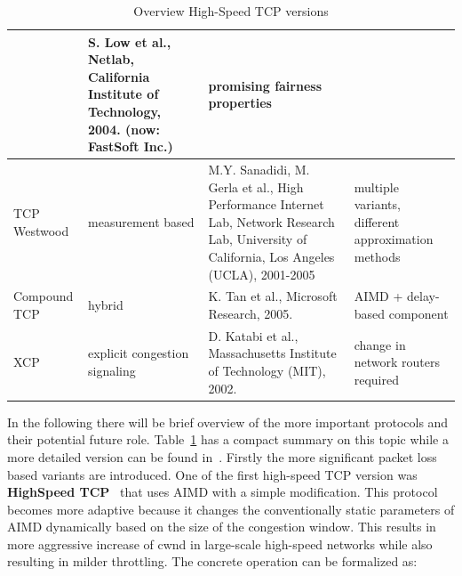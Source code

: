 \documentclass[a4paper]{article}
\begin{document}
\begin{table}
\begin{tabular}{|p{}|p{}|p{}|p{}|}
                                                                                      & S. Low et al., Netlab, California Institute of Technology, 2004. (now:
        FastSoft Inc.)                                                                & promising fairness properties
        \\\hline
        \cellcolor{blue!25}TCP Westwood                                               & measurement based
                                                                                      & M.Y. Sanadidi, M. Gerla et al., High Performance Internet Lab,
        Network Research Lab, University of California, Los Angeles (UCLA), 2001-2005 & multiple variants, different
        approximation methods
        \\\hline
        \cellcolor{blue!25}Compound TCP                                               & hybrid
                                                                                      & K. Tan et al., Microsoft Research, 2005.                               & AIMD + delay-based
        component
        \\\hline
        \cellcolor{blue!25}XCP                                                        & explicit congestion signaling
                                                                                      & D. Katabi et al., Massachusetts Institute of Technology (MIT),
        2002.                                                                         & change in network routers
        required                                                                                                                                                                     \\\hline
    \end{tabular}
    \caption{Overview High-Speed TCP versions}
    \label{table:tcpver}
\end{table}

In the following there will be brief overview of the more important protocols and their potential future role.
Table~\ref{table:tcpver} has a compact summary on this topic while a more detailed version can be found
in~\cite{TCPFairnessAnalysis}. Firstly the more significant packet loss based variants are introduced. One of the first
high-speed TCP version was \textbf{HighSpeed TCP}~\cite{HighSpeedTCP} that uses AIMD with a simple modification. This
protocol becomes more adaptive because it changes the conventionally static parameters of AIMD dynamically based on the
size of the congestion window. This results in more aggressive increase of cwnd in large-scale high-speed networks
while also resulting in milder throttling. The concrete operation can be formalized as:
\end{document}
